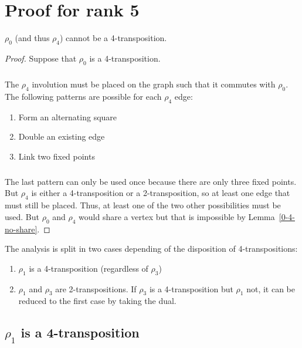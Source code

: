 \chapter{Proof for rank 5}

\begin{lemma}
  $\rho_0$ (and thus $\rho_4$) cannot be a 4-transposition.
\end{lemma}

\begin{proof}
  Suppose that $\rho_0$ is a 4-transposition.

  \paragraph{}
  The $\rho_4$ involution must be placed on the graph such that it commutes with $\rho_0$. The following patterns are possible for each $\rho_4$ edge:
  \begin{enumerate}
    \item Form an alternating square
    \item Double an existing edge
    \item Link two fixed points
  \end{enumerate}

  \paragraph{}
  The last pattern can only be used once because there are only three fixed points. But $\rho_4$ is either a 4-transposition or a 2-transposition, so at least one edge that must still be placed. Thus, at least one of the two other possibilities must be used. But $\rho_0$ and $\rho_4$ would share a vertex but that is impossible by Lemma~\ref{0-4-no-share}.
\end{proof}

The analysis is split in two cases depending of the disposition of 4-transpositions:
\begin{enumerate}
  \item $\rho_1$ is a 4-transposition (regardless of $\rho_3$)
  \item $\rho_1$ and $\rho_3$ are 2-transpositions. If $\rho_3$ is a 4-transposition but $\rho_1$ not, it can be reduced to the first case by taking the dual.
\end{enumerate}

\section{$\rho_1$ is a 4-transposition}

